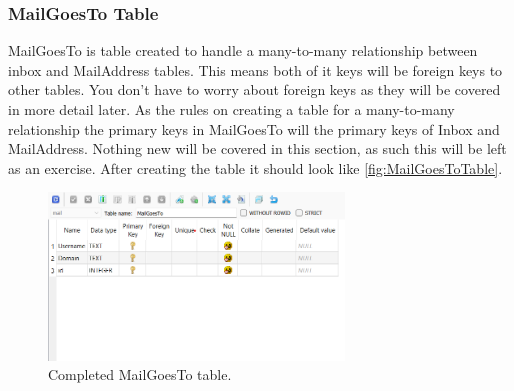 \documentclass[a4paper,11pt,oneside]{article}
\begin{document}
\begin{sloppypar}
\subsubsection{MailGoesTo Table}
\label{sqliteStudioMailGoesToTable}
MailGoesTo is table created to handle a many-to-many relationship between inbox and MailAddress tables. This means both of it keys will be foreign keys to other tables. You don't have to worry about foreign keys as they will be covered in more detail later. As the rules on creating a table for a many-to-many relationship the primary keys in MailGoesTo will the primary keys of Inbox and MailAddress. Nothing new will be covered in this section, as such this will be left as an exercise. After creating the table it should look like \autoref{fig:MailGoesToTable}. 
\begin{figure}[!htb]
  \centering
  \includegraphics[width=0.7\textwidth]{sqlitestudio/create_mail_goes_to/create_mail_goes_to.png}
  \caption{Completed MailGoesTo table.}
  \label{fig:MailGoesToTable}
\end{figure}

\end{sloppypar}
\end{document}
